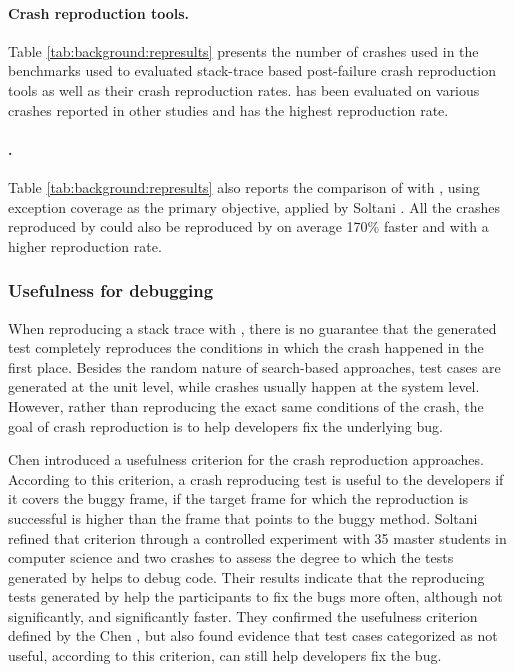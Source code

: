 \paragraph{Crash reproduction tools.}
%
Table \ref{tab:background:represults} presents the number of crashes used in the benchmarks used to evaluated stack-trace based post-failure crash reproduction tools as well as their crash reproduction rates. 
\evocrash has been evaluated on various crashes reported in other studies and has the highest reproduction rate.


\paragraph{\evosuite{}.}
%
Table \ref{tab:background:represults} also reports the comparison of \evocrash with \evosuite, using exception coverage as the primary objective, applied by Soltani \etal \cite{Soltani2018a}. All the crashes reproduced by \evosuite could also be reproduced by \evocrash on average 170\% faster and with a higher reproduction rate. 


\subsubsection{Usefulness for debugging}

When reproducing a stack trace with \evocrash, there is no guarantee that the generated test completely reproduces the conditions in which the crash happened in the first place. Besides the random nature of search-based approaches, test cases are generated at the unit level, while crashes usually happen at the system level. However, rather than reproducing the exact same conditions of the crash, the goal of crash reproduction is to help developers fix the underlying bug.

Chen \etal \cite{Chen2015} introduced a usefulness criterion for the crash reproduction approaches. 
According to this criterion, a crash reproducing test is useful to the developers if it covers the buggy frame, \ie if the target frame for which the reproduction is successful is higher than the frame that points to the buggy method.
Soltani \etal \cite{Soltani2018a} refined that criterion through a controlled experiment with 35 master students in computer science and two crashes to assess the degree to which the tests generated by \evocrash helps to debug code. 
Their results indicate that the reproducing tests generated by \evocrash help the participants to fix the bugs more often, although not significantly, and significantly faster. 
They confirmed the usefulness criterion defined by the Chen \etal \cite{Chen2015}, but also found evidence that test cases categorized as not useful, according to this criterion, can still help developers fix the bug.


